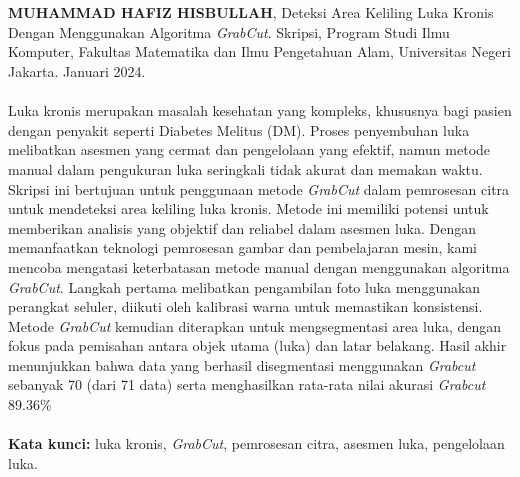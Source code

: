 \chapter*{}
\singlespacing{}

\textbf{MUHAMMAD HAFIZ HISBULLAH}, Deteksi Area Keliling Luka Kronis Dengan 
Menggunakan Algoritma \emph{GrabCut}. Skripsi, Program Studi Ilmu Komputer, Fakultas Matematika dan Ilmu Pengetahuan Alam, Universitas Negeri Jakarta. Januari 2024.
\\
\\
Luka kronis merupakan masalah kesehatan yang kompleks, khususnya bagi pasien dengan 
penyakit seperti Diabetes Melitus (DM). Proses penyembuhan luka melibatkan asesmen 
yang cermat dan pengelolaan yang efektif, namun metode manual dalam pengukuran 
luka seringkali tidak akurat dan memakan waktu. Skripsi ini bertujuan untuk penggunaan 
metode \emph{GrabCut} dalam pemrosesan citra untuk mendeteksi area keliling 
luka kronis. Metode ini memiliki potensi untuk memberikan analisis yang objektif 
dan reliabel dalam asesmen luka. Dengan memanfaatkan teknologi pemrosesan gambar 
dan pembelajaran mesin, kami mencoba mengatasi keterbatasan metode manual dengan 
menggunakan algoritma \emph{GrabCut}. Langkah pertama melibatkan pengambilan foto 
luka menggunakan perangkat seluler, diikuti oleh kalibrasi warna untuk memastikan 
konsistensi. Metode \emph{GrabCut} kemudian diterapkan untuk mengsegmentasi area 
luka, dengan fokus pada pemisahan antara objek utama (luka) dan latar belakang. 
Hasil akhir menunjukkan bahwa data yang berhasil disegmentasi menggunakan \emph{Grabcut}
sebanyak 70 (dari 71 data) serta menghasilkan rata-rata nilai akurasi \emph{Grabcut} 
89.36\% 
\\
\\
\textbf{Kata kunci:} luka kronis, \emph{GrabCut}, pemrosesan citra, asesmen luka, pengelolaan luka.
